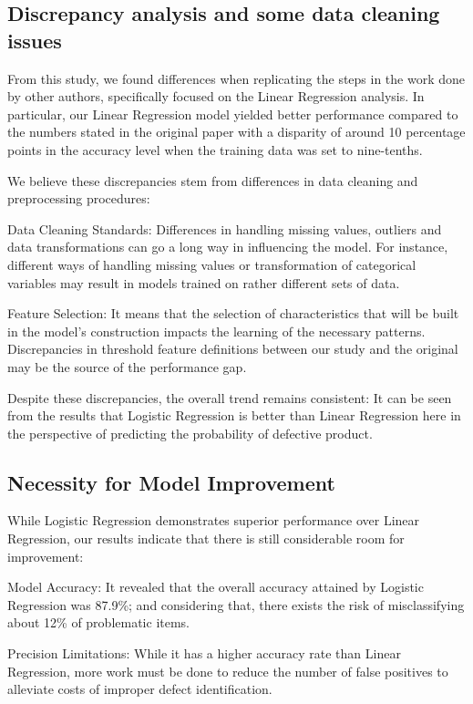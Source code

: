 \documentclass[conference]{IEEEtran}
\begin{document}
\subsection{Discrepancy analysis and some data cleaning issues}

From this study, we found differences when replicating the steps in the work done by other authors, specifically focused on the Linear Regression analysis. In particular, our Linear Regression model yielded better performance compared to the numbers stated in the original paper with a disparity of around 10 percentage points in the accuracy level when the training data was set to nine-tenths.

We believe these discrepancies stem from differences in data cleaning and preprocessing procedures:

Data Cleaning Standards: Differences in handling missing values, outliers and data transformations can go a long way in influencing the model. For instance, different ways of handling missing values or transformation of categorical variables may result in models trained on rather different sets of data.

Feature Selection: It means that the selection of characteristics that will be built in the model’s construction impacts the learning of the necessary patterns. Discrepancies in threshold feature definitions between our study and the original may be the source of the performance gap.

Despite these discrepancies, the overall trend remains consistent: It can be seen from the results that Logistic Regression is better than Linear Regression here in the perspective of predicting the probability of defective product.

\subsection{Necessity for Model Improvement}

While Logistic Regression demonstrates superior performance over Linear Regression, our results indicate that there is still considerable room for improvement:

Model Accuracy: It revealed that the overall accuracy attained by Logistic Regression was 87.9\%; and considering that, there exists the risk of misclassifying about 12\% of problematic items.

Precision Limitations: While it has a higher accuracy rate than Linear Regression, more work must be done to reduce the number of false positives to alleviate costs of improper defect identification.
\end{document}
